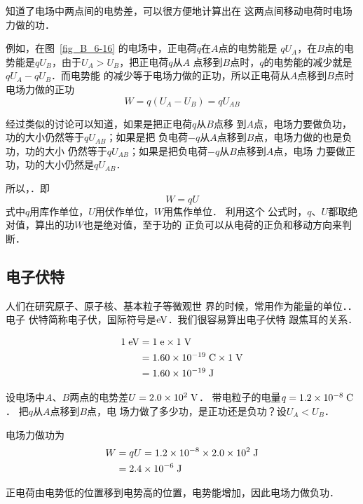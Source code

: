 知道了电场中两点间的电势差，可以很方便地计算出在
这两点间移动电荷时电场力做的功．

例如，在图~\ref{fig_B_6-16} 的电场中，正电荷$q$在$A$点的电势能是
$qU_A$，在$B$点的电势能是$qU_B$，由于$U_A>U_B$，把正电荷$q$从$A$
点移到$B$点时，$q$的电势能的减少就是$qU_A-qU_B$．而电势能
的减少等于电场力做的正功，所以正电荷从$A$点移到$B$点时
电场力做的正功
\[W=q(U_A-U_B)=qU_{AB}\]

经过类似的讨论可以知道，如果是把正电荷$q$从$B$点移
到$A$点，电场力要做负功，功的大小仍然等于$qU_{AB}$；如果是把
负电荷$-q$从$A$点移到$B$点，电场力做的也是负功，功的大小
仍然等于$qU_{AB}$；如果是把负电荷$-q$从$B$点移到$A$点，电场
力要做正功，功的大小仍然是$qU_{AB}$．

所以，．即
\[W=qU\]
式中$q$用库作单位，$U$用伏作单位，$W$用焦作单位．
利用这个
公式时，$q$、$U$都取绝对值，算出的功$W$也是绝对值，至于功的
正负可以从电荷的正负和移动方向来判断．

\subsection{电子伏特}


人们在研究原子、原子核、基本粒子等微观世
界的时候，常用作为能量的单位．．
电子
伏特简称电子伏，国际符号是$\text{eV}$．我们很容易算出电子伏特
跟焦耳的关系．

\[\begin{split}
    1 \;\text{eV} &=1 \;\text{e} \times 1 \;\text{V} \\
    &=1.60\times 10^{-19} \;\text{C} \times 1 \;\text{V}\\
&=1.60\times 10^{-19} \;\text{J} 
\end{split}    \]


\begin{example}
    设电场中$A$、$B$两点的电势差$U=2.0\times10^2 \;\text{V}$．
    带电粒子的电量$q=1.2\times10^{-8} \;\text{C}$．
    把$q$从$A$点移到$B$点，电
    场力做了多少功，是正功还是负功？设$U_A<U_B$．
\end{example}

\begin{solution}
电场力做功为
\[\begin{split}
    W&=qU=1.2\times10^{-8}\times2.0\times10^2 \;\text{J} \\
&=2.4\times10^{-6} \;\text{J}
\end{split} \]

正电荷由电势低的位置移到电势高的位置，电势能增加，因此电场力做负功．
\end{solution}

